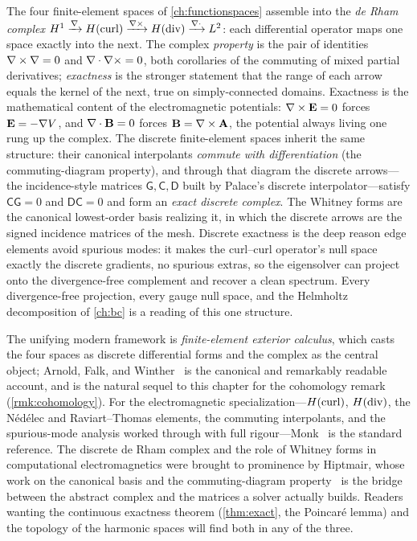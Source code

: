 \summarysection
The four finite-element spaces of \cref{ch:functionspaces} assemble into the
\emph{de Rham complex}
$H^1\xrightarrow{\nabla}H(\mathrm{curl})\xrightarrow{\nabla\times}H(\mathrm{div})\xrightarrow{\nabla\cdot}L^2$:
each differential operator maps one space exactly into the next. The complex
\emph{property} is the pair of identities $\nabla\times\nabla=0$ and $\nabla\cdot\nabla\times=0$, both
corollaries of the commuting of mixed partial derivatives; \emph{exactness} is the
stronger statement that the range of each arrow equals the kernel of the next, true on
simply-connected domains. Exactness is the mathematical content of the electromagnetic
potentials: $\nabla\times\mathbf{E}=0$ forces $\mathbf{E}=-\nabla V$, and $\nabla\cdot\mathbf{B}=0$ forces $\mathbf{B}=\nabla\times\mathbf{A}$,
the potential always living one rung up the complex. The discrete finite-element spaces
inherit the same structure: their canonical interpolants \emph{commute with
differentiation} (the commuting-diagram property), and through that diagram the discrete
arrows---the incidence-style matrices $\mathsf{G},\mathsf{C},\mathsf{D}$ built by
Palace's discrete interpolator---satisfy $\mathsf{C}\mathsf{G}=0$ and
$\mathsf{D}\mathsf{C}=0$ and form an \emph{exact discrete complex}. The Whitney forms are
the canonical lowest-order basis realizing it, in which the discrete arrows are the
signed incidence matrices of the mesh. Discrete exactness is the deep reason edge
elements avoid spurious modes: it makes the curl--curl operator's null space exactly the
discrete gradients, no spurious extras, so the eigensolver can project onto the
divergence-free complement and recover a clean spectrum. Every divergence-free
projection, every gauge null space, and the Helmholtz decomposition of \cref{ch:bc} is a
reading of this one structure.

\furtherreading
\label{sec:furtherreading}
The unifying modern framework is \emph{finite-element exterior calculus}, which casts
the four spaces as discrete differential forms and the complex as the central object;
Arnold, Falk, and Winther~\citep{arnold2006feec} is the canonical and remarkably readable
account, and is the natural sequel to this chapter for the cohomology remark
(\cref{rmk:cohomology}). For the electromagnetic specialization---$H(\mathrm{curl})$, $H(\mathrm{div})$, the
N\'ed\'elec and Raviart--Thomas elements, the commuting interpolants, and the spurious-mode
analysis worked through with full rigour---Monk~\citep{monk2003} is the standard reference.
The discrete de Rham complex and the role of Whitney forms in computational
electromagnetics were brought to prominence by Hiptmair, whose work on the canonical
basis and the commuting-diagram property~\citep{hiptmair1998} is the bridge between the
abstract complex and the matrices a solver actually builds. Readers wanting the continuous
exactness theorem (\cref{thm:exact}, the Poincar\'e lemma) and the topology of the harmonic
spaces will find both in any of the three.

